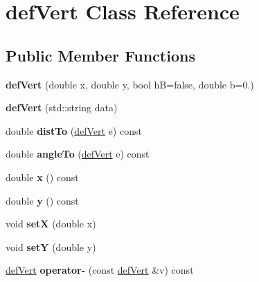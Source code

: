 \hypertarget{classdefVert}{\section{def\-Vert Class Reference}
\label{classdefVert}
}
\subsection*{Public Member Functions}
\begin{DoxyCompactItemize}
\item 
\hypertarget{classdefVert_a64c3464016052b652238cbf92f4419a1}{{\bfseries def\-Vert} (double x, double y, bool h\-B=false, double b=0.)}\label{classdefVert_a64c3464016052b652238cbf92f4419a1}

\item 
\hypertarget{classdefVert_af0f40cc243c9cadc0005c9a60bb37a9f}{{\bfseries def\-Vert} (std\-::string data)}\label{classdefVert_af0f40cc243c9cadc0005c9a60bb37a9f}

\item 
\hypertarget{classdefVert_a344a81fe4b3cf2dbb19a6b33a908e9c5}{double {\bfseries dist\-To} (\hyperlink{classdefVert}{def\-Vert} e) const }\label{classdefVert_a344a81fe4b3cf2dbb19a6b33a908e9c5}

\item 
\hypertarget{classdefVert_a5dd121d6aa7759f0f609ebe03dacdec0}{double {\bfseries angle\-To} (\hyperlink{classdefVert}{def\-Vert} e) const }\label{classdefVert_a5dd121d6aa7759f0f609ebe03dacdec0}

\item 
\hypertarget{classdefVert_a7fdea36a06dd978c2331b25a69e29b4e}{double {\bfseries x} () const }\label{classdefVert_a7fdea36a06dd978c2331b25a69e29b4e}

\item 
\hypertarget{classdefVert_a2a77954166f07aaf7868b5ee03b5cfbd}{double {\bfseries y} () const }\label{classdefVert_a2a77954166f07aaf7868b5ee03b5cfbd}

\item 
\hypertarget{classdefVert_aa92fabefdf6a16e4d622f79178aaaded}{void {\bfseries set\-X} (double x)}\label{classdefVert_aa92fabefdf6a16e4d622f79178aaaded}

\item 
\hypertarget{classdefVert_ad145851c17358bc5339d767b7cecb732}{void {\bfseries set\-Y} (double y)}\label{classdefVert_ad145851c17358bc5339d767b7cecb732}

\item 
\hypertarget{classdefVert_a119b685d2c6464899c280e0587aaf3f2}{\hyperlink{classdefVert}{def\-Vert} {\bfseries operator-\/} (const \hyperlink{classdefVert}{def\-Vert} \&v) const }\label{classdefVert_a119b685d2c6464899c280e0587aaf3f2}


\end{DoxyCompactItemize}
